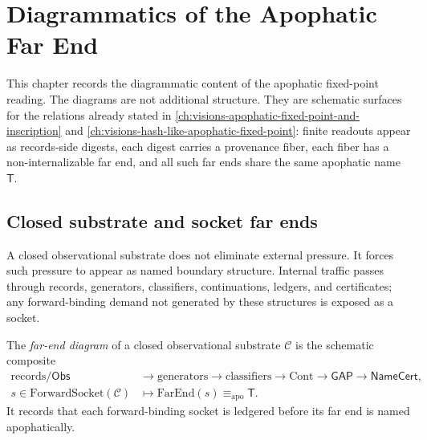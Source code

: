 \chapter{Diagrammatics of the Apophatic Far End}
\label{ch:visions-apophatic-far-end-diagrammatics}

This chapter records the diagrammatic content of the apophatic fixed-point
reading. The diagrams are not additional structure. They are schematic
surfaces for the relations already stated in
\autoref{ch:visions-apophatic-fixed-point-and-inscription} and
\autoref{ch:visions-hash-like-apophatic-fixed-point}: finite readouts appear
as records-side digests, each digest carries a provenance fiber, each fiber
has a non-internalizable far end, and all such far ends share the same
apophatic name $\mathsf{T}$.

\section{Closed substrate and socket far ends}
\label{sec:far-end-diagrammatics-closed-substrate}

A closed observational substrate does not eliminate external pressure. It
forces such pressure to appear as named boundary structure. Internal traffic
passes through records, generators, classifiers, continuations, ledgers, and
certificates; any forward-binding demand not generated by these structures is
exposed as a socket.

\begin{definition}
\label{def:far-end-diagram-closed-substrate}
The \emph{far-end diagram} of a closed observational substrate $\mathcal{C}$
is the schematic composite
$$
\begin{aligned}
\mathrm{records}/\mathsf{Obs}
&\longrightarrow \mathrm{generators}
\longrightarrow \mathrm{classifiers}
\longrightarrow \mathrm{Cont}
\longrightarrow \mathsf{GAP}
\longrightarrow \mathsf{NameCert},\\
s \in \mathrm{ForwardSocket}(\mathcal{C})
&\longmapsto
\mathrm{FarEnd}(s)
\equiv_{\mathrm{apo}} \mathsf{T}.
\end{aligned}
$$
It records that each forward-binding socket is ledgered before its far end is
named apophatically.
\end{definition}

